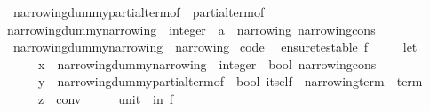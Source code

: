 \begin{isabellebody}
\isanewline
\ \ {\isachardoublequoteopen}narrowing{\isacharunderscore}{\kern0pt}dummy{\isacharunderscore}{\kern0pt}partial{\isacharunderscore}{\kern0pt}term{\isacharunderscore}{\kern0pt}of\ {\isacharequal}{\kern0pt}\ partial{\isacharunderscore}{\kern0pt}term{\isacharunderscore}{\kern0pt}of{\isachardoublequoteclose}\isanewline
\isanewline
{}\isamarkupfalse%
\ narrowing{\isacharunderscore}{\kern0pt}dummy{\isacharunderscore}{\kern0pt}narrowing\ {\isacharcolon}{\kern0pt}{\isacharcolon}{\kern0pt}\ {\isachardoublequoteopen}integer\ {\isacharequal}{\kern0pt}{\isachargreater}{\kern0pt}\ {\isacharparenleft}{\kern0pt}{\isacharprime}{\kern0pt}a\ {\isacharcolon}{\kern0pt}{\isacharcolon}{\kern0pt}\ narrowing{\isacharparenright}{\kern0pt}\ narrowing{\isacharunderscore}{\kern0pt}cons{\isachardoublequoteclose}\isanewline
{}\isanewline
\ \ {\isachardoublequoteopen}narrowing{\isacharunderscore}{\kern0pt}dummy{\isacharunderscore}{\kern0pt}narrowing\ {\isacharequal}{\kern0pt}\ narrowing{\isachardoublequoteclose}\isanewline
\isanewline
{}\isamarkupfalse%
\ {\isacharbrackleft}{\kern0pt}code{\isacharbrackright}{\kern0pt}{\isacharcolon}{\kern0pt}\isanewline
\ \ {\isachardoublequoteopen}ensure{\isacharunderscore}{\kern0pt}testable\ f\ {\isacharequal}{\kern0pt}\isanewline
\ \ \ \ {\isacharparenleft}{\kern0pt}let\isanewline
\ \ \ \ \ \ x\ {\isacharequal}{\kern0pt}\ narrowing{\isacharunderscore}{\kern0pt}dummy{\isacharunderscore}{\kern0pt}narrowing\ {\isacharcolon}{\kern0pt}{\isacharcolon}{\kern0pt}\ integer\ {\isacharequal}{\kern0pt}{\isachargreater}{\kern0pt}\ bool\ narrowing{\isacharunderscore}{\kern0pt}cons{\isacharsemicolon}{\kern0pt}\isanewline
\ \ \ \ \ \ y\ {\isacharequal}{\kern0pt}\ narrowing{\isacharunderscore}{\kern0pt}dummy{\isacharunderscore}{\kern0pt}partial{\isacharunderscore}{\kern0pt}term{\isacharunderscore}{\kern0pt}of\ {\isacharcolon}{\kern0pt}{\isacharcolon}{\kern0pt}\ bool\ itself\ {\isacharequal}{\kern0pt}{\isachargreater}{\kern0pt}\ narrowing{\isacharunderscore}{\kern0pt}term\ {\isacharequal}{\kern0pt}{\isachargreater}{\kern0pt}\ term{\isacharsemicolon}{\kern0pt}\isanewline
\ \ \ \ \ \ z\ {\isacharequal}{\kern0pt}\ {\isacharparenleft}{\kern0pt}conv\ {\isacharcolon}{\kern0pt}{\isacharcolon}{\kern0pt}\ {\isacharunderscore}{\kern0pt}\ {\isacharequal}{\kern0pt}{\isachargreater}{\kern0pt}\ {\isacharunderscore}{\kern0pt}\ {\isacharequal}{\kern0pt}{\isachargreater}{\kern0pt}\ unit{\isacharparenright}{\kern0pt}\ \ in\ f{\isacharparenright}{\kern0pt}{\isachardoublequoteclose}\isanewline
%
\isadelimproof

\end{isabellebody}
